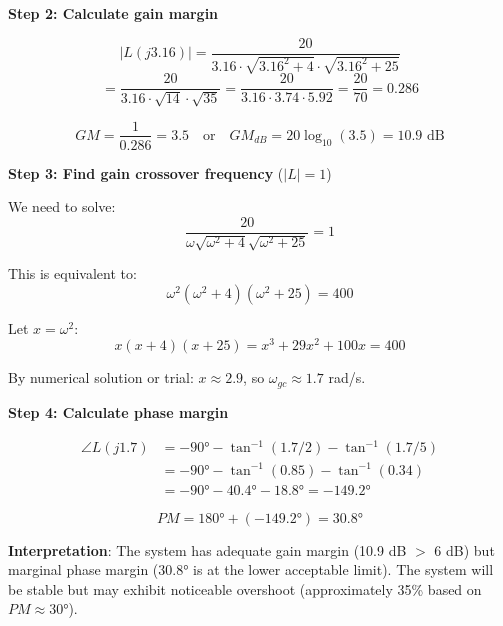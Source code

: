 \textbf{Step 2: Calculate gain margin}

\begin{equation}
    |L(j3.16)| = \frac{20}{3.16 \cdot \sqrt{3.16^2 + 4} \cdot \sqrt{3.16^2 + 25}}
\end{equation}
\begin{equation}
    = \frac{20}{3.16 \cdot \sqrt{14} \cdot \sqrt{35}} = \frac{20}{3.16 \cdot 3.74 \cdot 5.92} = \frac{20}{70} = 0.286
\end{equation}

\begin{equation}
    GM = \frac{1}{0.286} = \boxed{3.5} \quad \text{or} \quad GM_{dB} = 20\log_{10}(3.5) = \boxed{10.9 \text{ dB}}
\end{equation}

\textbf{Step 3: Find gain crossover frequency} ($|L| = 1$)

We need to solve:
\begin{equation}
    \frac{20}{\omega\sqrt{\omega^2+4}\sqrt{\omega^2+25}} = 1
\end{equation}

This is equivalent to:
\begin{equation}
    \omega^2(\omega^2+4)(\omega^2+25) = 400
\end{equation}

Let $x = \omega^2$:
\begin{equation}
    x(x+4)(x+25) = x^3 + 29x^2 + 100x = 400
\end{equation}

By numerical solution or trial: $x \approx 2.9$, so $\omega_{gc} \approx 1.7$ rad/s.

\textbf{Step 4: Calculate phase margin}

\begin{align}
    \angle L(j1.7) &= -90° - \tan^{-1}(1.7/2) - \tan^{-1}(1.7/5) \\
    &= -90° - \tan^{-1}(0.85) - \tan^{-1}(0.34) \\
    &= -90° - 40.4° - 18.8° = -149.2°
\end{align}

\begin{equation}
    PM = 180° + (-149.2°) = \boxed{30.8°}
\end{equation}

\textbf{Interpretation}: The system has adequate gain margin (10.9 dB $>$ 6 dB) but marginal phase margin (30.8° is at the lower acceptable limit). The system will be stable but may exhibit noticeable overshoot (approximately 35\% based on $PM \approx 30°$).


